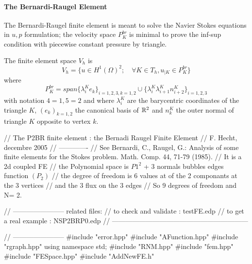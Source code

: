 \documentclass[a4paper,twoside,12pt]{book}
\begin{document}
\paragraph{The Bernardi-Raugel Element}
 The Bernardi-Raugel finite element is meant to solve the Navier Stokes equations in
 $ u,p$ formulation;  the velocity space $P^{br}_K$ is minimal to prove the inf-sup condition
 with piecewise constant pressure by triangle.

 The finite element space $V_h$ is
 $$V_h= \{u\in H^1(\Omega)^2 ; \quad \forall K \in T_h,  u_{|K} \in P^{br}_K \} $$
 where
 $$ P^{br}_K = span \{ \lambda^K_i e_k \}_{i=1,2,3, k= 1,2} \cup \{  \lambda^K_i\lambda^K_{i+1} n^K_{i+2}\}_{i=1,2,3} $$
 with notation $4=1, 5=2$ and where
 $\lambda^K_i$ are the barycentric coordinates of the triangle $K$, $(e_k)_{k=1,2}$ the canonical basis  of $\mathbb{R}^2$
 and $n^K_k$ the outer  normal of triangle $K$ opposite to vertex $k$.

 \bFF
// The  P2BR finite element : the Bernadi Raugel Finite Element\hfilll
// F. Hecht, decembre 2005\hfilll
// -------------\hfilll
// See Bernardi, C., Raugel, G.: Analysis of some finite elements for the Stokes problem. Math. Comp. 44, 71-79 (1985).\hfilll
//  It is  a 2d coupled FE \hfilll
// the Polynomial space is $ P1^2$ + 3 normals bubbles edges function $(P_2)$\hfilll
// the degree of freedom is 6 values at of the 2 componants at the  3 vertices\hfilll
// and the 3 flux on the 3 edges  \hfilll
//   So 9 degrees of freedom and  N= 2. \hfilll

// -----------------------  related files: \hfilll
//  to check  and validate  :  testFE.edp \hfilll
//  to get a real example   :  NSP2BRP0.edp\hfilll
// ------------------------------------------------------------\hfilll

// -----------------------
#include "error.hpp"
#include "AFunction.hpp"
#include "rgraph.hpp"
using namespace std;
#include "RNM.hpp"
#include "fem.hpp"
#include "FESpace.hpp"
#include "AddNewFE.h"
\end{document}

